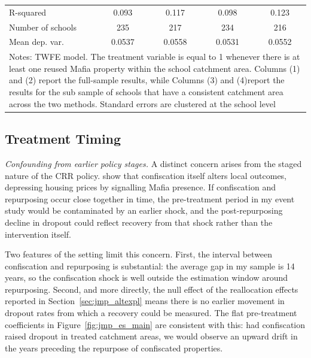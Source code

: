 \documentclass[12pt]{article}
\theoremstyle{plain}
\theoremstyle{plain}
\theoremstyle{plain}
\theoremstyle{definition}
\theoremstyle{plain}
\theoremstyle{definition}
\theoremstyle{plain}
\theoremstyle{remark}
\theoremstyle{definition}
\theoremstyle{definition}
\theoremstyle{plain}
\begin{document}
\begin{table}[H]
{\begin{tabular}{p{12.39em}llll}
			\multicolumn{1}{l}{R-squared} & \multicolumn{1}{c}{0.093} & \multicolumn{1}{c}{0.117} & \multicolumn{1}{c}{0.098} & \multicolumn{1}{c}{0.123} \\
			\multicolumn{1}{l}{Number of schools} & \multicolumn{1}{c}{235} & \multicolumn{1}{c}{217} & \multicolumn{1}{c}{234} & \multicolumn{1}{c}{216} \\
			\multicolumn{1}{l}{Mean dep. var.} & \multicolumn{1}{c}{0.0537} & \multicolumn{1}{c}{0.0558} & \multicolumn{1}{c}{0.0531} & \multicolumn{1}{c}{0.0552} \\
			\midrule
			\multicolumn{5}{p{45.385em}}{Notes: TWFE model. The treatment variable is equal to 1 whenever there is at least one reused Mafia property within the school catchment area. Columns (1) and (2) report the full-sample results, while Columns (3) and (4)report the results for the sub sample of schools that have a consistent catchment area across the two methods. Standard errors are clustered at the school level} \\
		\end{tabular}%
	}
\end{table}


\subsection{Treatment Timing}
\label{sec:jmp_treattiming}
\emph{Confounding from earlier policy stages.} A distinct concern arises from the staged nature of the CRR policy. \citet{boeri_localized_2023} show that confiscation itself alters local outcomes, depressing housing prices by signalling Mafia presence. If confiscation and repurposing occur close together in time, the pre-treatment period in my event study would be contaminated by an earlier shock, and the post-repurposing decline in dropout could reflect recovery from that shock rather than the intervention itself.

Two features of the setting limit this concern. First, the interval between confiscation and repurposing is substantial: the average gap in my sample is 14 years, so the confiscation shock is well outside the estimation window around repurposing. Second, and more directly, the null effect of the reallocation effects reported in Section~\ref{sec:jmp_altexpl} means there is no earlier movement in dropout rates from which a recovery could be measured. The flat pre-treatment coefficients in Figure~\ref{fig:jmp_es_main} are consistent with this: had confiscation raised dropout in treated catchment areas, we would observe an upward drift in the years preceding the repurpose of confiscated properties.
\end{document}
